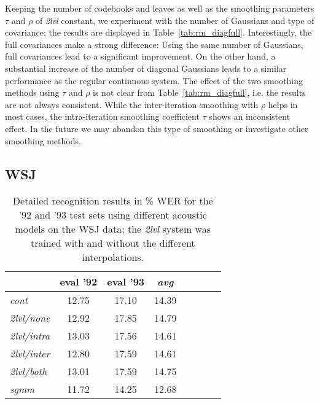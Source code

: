 \documentclass{article}
\begin{document}
Keeping the number of codebooks and leaves as well as the smoothing parameters
$\tau$ and $\rho$ of {\em 2lvl} constant, we experiment with the number of
Gaussians and type of covariance; the results are displayed in 
Table~\ref{tab:rm_diagfull}.
Interestingly, the full covariances make a strong difference: Using the same
number of Gaussians, full covariances lead to a significant improvement.
On the other hand, a substantial increase of the number of diagonal Gaussians 
leads to a similar performance as the regular continuous system.
%
The effect of the two smoothing methods using $\tau$ and $\rho$ is not
clear from Table~\ref{tab:rm_diagfull}, i.e. the results are not always
consistent.  While the inter-iteration smoothing with $\rho$
helps in most cases, the intra-iteration smoothing coefficient $\tau$ 
shows an inconsistent effect.  In the future we may abandon this type of
smoothing or investigate other smoothing methods. 


\subsection{WSJ}

\begin{table}%
\begin{center}
\begin{tabular}{|l||c|c|c|c|c|c||c|}
\hline
~                & eval '92 & eval '93 & {\em avg} \\ \hline\hline
{\em cont}       &    12.75 &    17.10 &     14.39 \\ \hline
{\em 2lvl/none}  &    12.92 &    17.85 &     14.79 \\ \hline
{\em 2lvl/intra} &    13.03 &    17.56 &     14.61 \\ \hline
{\em 2lvl/inter} &    12.80 &    17.59 &     14.61 \\ \hline
{\em 2lvl/both}  &    13.01 &    17.59 &     14.75 \\ \hline
{\em sgmm}       &    11.72 &    14.25 &     12.68 \\ \hline
\end{tabular}
\end{center}
\caption{\label{tab:res_wsj}
Detailed recognition results in \% WER for the '92 and '93 test sets using 
different acoustic models on the WSJ data; the {\em 2lvl} system was trained
with and without the different interpolations.
}
\end{table}
\end{document}
